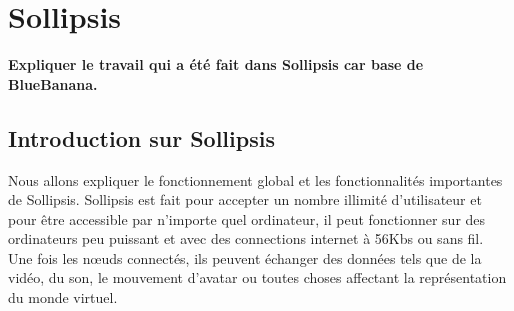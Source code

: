 \section{Sollipsis}
	\textbf{Expliquer le travail qui a été fait dans Sollipsis car base de BlueBanana. }
	\subsection{Introduction sur Sollipsis} 
	Nous allons expliquer le fonctionnement global et les fonctionnalités importantes de Sollipsis. Sollipsis est fait pour accepter un nombre illimité d'utilisateur et pour être accessible par n'importe quel ordinateur, il peut fonctionner sur des ordinateurs peu puissant et avec des connections internet à 56Kbs ou sans fil. Une fois les nœuds connectés, ils peuvent échanger des données tels que de la vidéo, du son, le mouvement d'avatar ou toutes choses affectant la représentation du monde virtuel. \\
